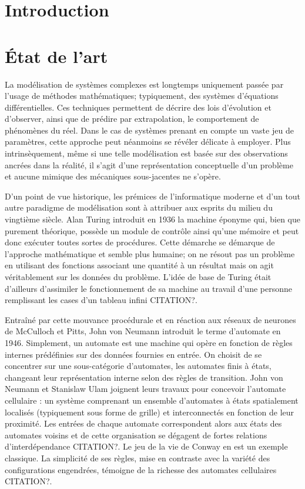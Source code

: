 \documentclass[10pt]{article}
\begin{document}
\begin{multicols}{2}

\section{Introduction}

\section{\'Etat de l'art}

La modélisation de systèmes complexes est longtemps uniquement passée
par l'usage de méthodes mathématiques; typiquement, des systèmes
d'équations différentielles. Ces techniques permettent de décrire des
lois d'évolution et d'observer, ainsi que de prédire par
extrapolation, le comportement de phénomènes du réel. Dans le cas de
systèmes prenant en compte un vaste jeu de paramètres, cette approche
peut néanmoins se révéler délicate à employer. Plus intrinsèquement,
même si une telle modélisation est basée sur des observations ancrées
dans la réalité, il s'agit d'une représentation conceptuelle d'un
problème et aucune mimique des mécaniques sous-jacentes ne s'opère.

D'un point de vue historique, les prémices de l'informatique moderne
et d'un tout autre paradigme de modélisation sont à attribuer aux
esprits du milieu du vingtième siècle. Alan Turing introduit en 1936
la machine éponyme qui, bien que purement théorique, possède un module
de contrôle ainsi qu'une mémoire et peut donc exécuter toutes sortes
de procédures. Cette démarche se démarque de l'approche mathématique
et semble plus humaine; on ne résout pas un problème en utilisant des
fonctions associant une quantité à un résultat mais on agit
véritablement sur les données du problème. L'idée de base de Turing
était d'ailleurs d'assimiler le fonctionnement de sa machine au
travail d'une personne remplissant les cases d'un tableau infini
CITATION?.

Entraîné par cette mouvance procédurale et en réaction aux réseaux de
neurones de McCulloch et Pitts, John von Neumann introduit le terme
d'automate en 1946. Simplement, un automate est une machine qui opère
en fonction de règles internes prédéfinies sur des données fournies en
entrée. On choisit de se concentrer sur une sous-catégorie
d'automates, les automates finis à états, changeant leur
représentation interne selon des règles de transition. John von
Neumann et Stanislaw Ulam joignent leurs travaux pour concevoir
l'automate cellulaire : un système comprenant un ensemble d'automates
à états spatialement localisés (typiquement sous forme de grille) et
interconnectés en fonction de leur proximité. Les entrées de chaque
automate correspondent alors aux états des automates voisins et de
cette organisation se dégagent de fortes relations d'interdépendance
CITATION?. Le jeu de la vie de Conway en est un exemple classique. La
simplicité de ses règles, mise en contraste avec la variété des
configurations engendrées, témoigne de la richesse des automates
cellulaires CITATION?.


\end{multicols}
\end{document}
